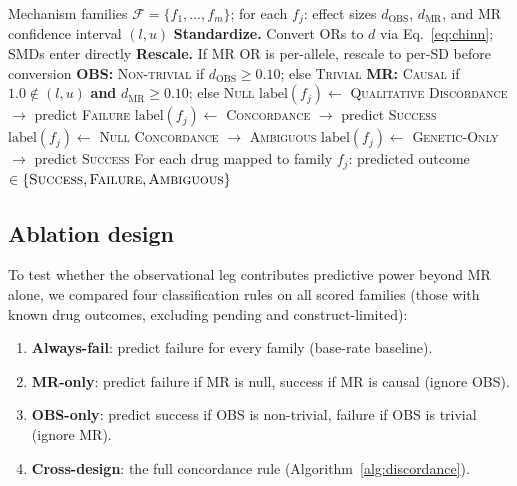 \documentclass[11pt]{article}
\begin{document}
\begin{algorithm}[t]
\caption{Cross-Design Concordance Classification}
\label{alg:discordance}
\begin{algorithmic}[1]
\REQUIRE Mechanism families $\mathcal{F} = \{f_1, \ldots, f_m\}$; for each $f_j$: effect sizes $d_{\text{OBS}}$, $d_{\text{MR}}$, and MR confidence interval $(l, u)$
\medskip
\STATE \textbf{Standardize.} Convert ORs to $d$ via Eq.~\ref{eq:chinn}; SMDs enter directly
\STATE \textbf{Rescale.} If MR OR is per-allele, rescale to per-SD before conversion
\medskip
{}
  \STATE \textbf{OBS:} \textsc{Non-trivial} if $d_{\text{OBS}} \geq 0.10$; else \textsc{Trivial}
  \STATE \textbf{MR:} \textsc{Causal} if $1.0 \notin (l, u)$ \textbf{and} $d_{\text{MR}} \geq 0.10$; else \textsc{Null}
    \STATE $\text{label}(f_j) \leftarrow$ \textsc{Qualitative Discordance} $\rightarrow$ predict \textsc{Failure}
    \STATE $\text{label}(f_j) \leftarrow$ \textsc{Concordance} $\rightarrow$ predict \textsc{Success}
    \STATE $\text{label}(f_j) \leftarrow$ \textsc{Null Concordance} $\rightarrow$ \textsc{Ambiguous}
    \STATE $\text{label}(f_j) \leftarrow$ \textsc{Genetic-Only} $\rightarrow$ predict \textsc{Success}
  \ENDIF
\ENDFOR
\medskip
\ENSURE For each drug mapped to family $f_j$: predicted outcome $\in \{\textsc{Success}, \textsc{Failure}, \textsc{Ambiguous}\}$
\end{algorithmic}
\end{algorithm}

\subsection{Ablation design}

To test whether the observational leg contributes predictive power beyond MR alone, we compared four classification rules on all scored families (those with known drug outcomes, excluding pending and construct-limited):

\begin{enumerate}
\item \textbf{Always-fail}: predict failure for every family (base-rate baseline).
\item \textbf{MR-only}: predict failure if MR is null, success if MR is causal (ignore OBS).
\item \textbf{OBS-only}: predict success if OBS is non-trivial, failure if OBS is trivial (ignore MR).
\item \textbf{Cross-design}: the full concordance rule (Algorithm~\ref{alg:discordance}).
\end{enumerate}
\end{document}
